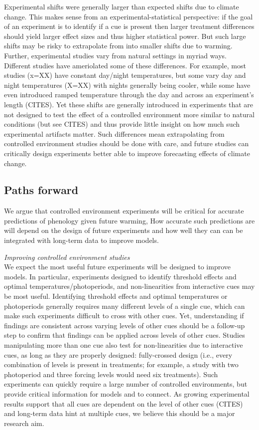 \documentclass[11pt,letter]{article}
\begin{document}
Experimental shifts were generally larger than expected shifts due to climate change. This makes sense from an experimental-statistical perspective: if the goal of an experiment is to identify if a cue is present then larger treatment differences should yield larger effect sizes and thus higher statistical power. But such large shifts may be risky to extrapolate from into smaller shifts due to warming. Further, experimental studies vary from natural settings in myriad ways. Different studies have ameriolated some of these differences. For example, most studies (x=XX) have constant day/night temperatures, but some vary day and night temperatures (X=XX) with nights generally being cooler, while some have even introduced ramped temperature through the day and across an experiment's length (CITES). Yet these shifts are generally introduced in experiments that are not designed to test the effect of a controlled environment more similar to natural conditions (but see CITES) and thus provide little insight on how much such experimental artifacts matter. Such differences mean extrapolating from controlled environment studies should be done with care, and future studies can critically design experiments better able to improve forecasting effects of climate change. 

\subsection{Paths forward}
We argue that controlled environment experiments will be critical for accurate predictions of phenology given future warming, How accurate such predictions are will depend on the design of future experiments and how well they can can be integrated with long-term data to improve models. 

\emph{Improving controlled environment studies}\\
We expect the most useful future experiments will be designed to improve models. In particular, experiments designed to identify threshold effects and optimal temperatures/photoperiods, and non-linearities from interactive cues may be most useful. Identifying threshold effects and optimal temperatures or photoperiods generally requires many different levels of a single cue, which can make such experiments difficult to cross with other cues. Yet, understanding if findings are consistent across varying levels of other cues should be a follow-up step to confirm that findings can be applied across levels of other cues. Studies manipulating more than one cue also test for non-linearities due to interactive cues, as long as they are properly designed: fully-crossed design (i.e., every combination of levels is present in treatments; for example, a study with two photoperiod and three forcing levels would need six treatments). Such experiments can quickly require a large number of controlled environments, but provide critical information for models and to connect. As growing experimental results support that all cues are dependent on the level of other cues (CITES) and long-term data hint at multiple cues, we believe this should be a major research aim.
\end{document}
